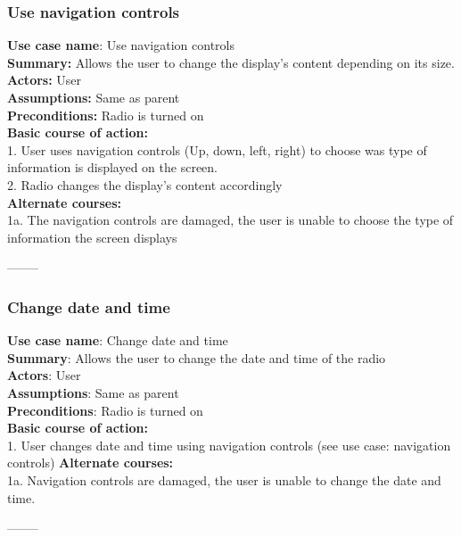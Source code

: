 \documentclass[11pt]{article}
\begin{document}
\subsubsection{Use navigation controls}
\textbf{Use case name}: Use navigation controls\\
\textbf{Summary:} Allows the user to change the display's content depending on its size.\\
\textbf{Actors:} User\\
\textbf{Assumptions:} Same as parent\\
\textbf{Preconditions:} Radio is turned on\\
\textbf{Basic course of action:}\\
1. User uses navigation controls (Up, down, left, right) to choose was type of information is displayed on the screen.\\
2. Radio changes the display's content accordingly\\
\textbf{Alternate courses:}\\
1a. The navigation controls are damaged, the user is unable to choose the type of information the screen displays
\begin{center}--------\end{center}

\subsubsection{Change date and time}
\textbf{Use case name}: Change date and time\\
\textbf{Summary}: Allows the user to change the date and time of the radio\\
\textbf{Actors}: User\\
\textbf{Assumptions}: Same as parent\\
\textbf{Preconditions}: Radio is turned on\\
\textbf{Basic course of action:}\\
1. User changes date and time using navigation controls (see use case: navigation controls)
\textbf{Alternate courses: }\\
1a. Navigation controls are damaged, the user is unable to change the date and time.
\begin{center}--------\end{center}
\end{document}
